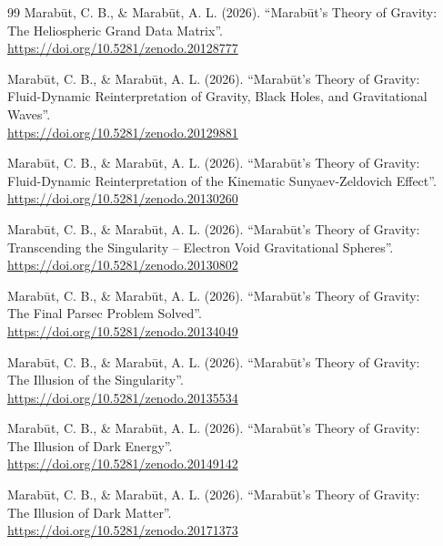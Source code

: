 \documentclass[11pt, a4paper]{article}
\begin{document}
\begin{thebibliography}{99}
  Marab\={u}t, C. B., \& Marab\={u}t, A. L. (2026). ``Marab\={u}t's Theory of Gravity: \\
  The Heliospheric Grand Data Matrix''. \\
  \url{https://doi.org/10.5281/zenodo.20128777}

  Marab\={u}t, C. B., \& Marab\={u}t, A. L. (2026). ``Marab\={u}t's Theory of Gravity: \\
  Fluid-Dynamic Reinterpretation of Gravity, Black Holes, and Gravitational Waves''. \\ \url{https://doi.org/10.5281/zenodo.20129881}

  Marab\={u}t, C. B., \& Marab\={u}t, A. L. (2026). ``Marab\={u}t's Theory of Gravity: \\
  Fluid-Dynamic Reinterpretation of the Kinematic Sunyaev-Zeldovich Effect''. \\
  \url{https://doi.org/10.5281/zenodo.20130260}

  Marab\={u}t, C. B., \& Marab\={u}t, A. L. (2026). ``Marab\={u}t's Theory of Gravity: \\
  Transcending the Singularity -- Electron Void Gravitational Spheres''. \\
  \url{https://doi.org/10.5281/zenodo.20130802}

  Marab\={u}t, C. B., \& Marab\={u}t, A. L. (2026). ``Marab\={u}t's Theory of Gravity: \\
  The Final Parsec Problem Solved''. \\
  \url{https://doi.org/10.5281/zenodo.20134049}

  Marab\={u}t, C. B., \& Marab\={u}t, A. L. (2026). ``Marab\={u}t's Theory of Gravity: \\
  The Illusion of the Singularity''. \\
  \url{https://doi.org/10.5281/zenodo.20135534}

  Marab\={u}t, C. B., \& Marab\={u}t, A. L. (2026). ``Marab\={u}t's Theory of Gravity: \\
  The Illusion of Dark Energy''. \\
  \url{https://doi.org/10.5281/zenodo.20149142}

  Marab\={u}t, C. B., \& Marab\={u}t, A. L. (2026). ``Marab\={u}t's Theory of Gravity: \\
  The Illusion of Dark Matter''. \\
  \url{https://doi.org/10.5281/zenodo.20171373}


\end{thebibliography}
\end{document}

